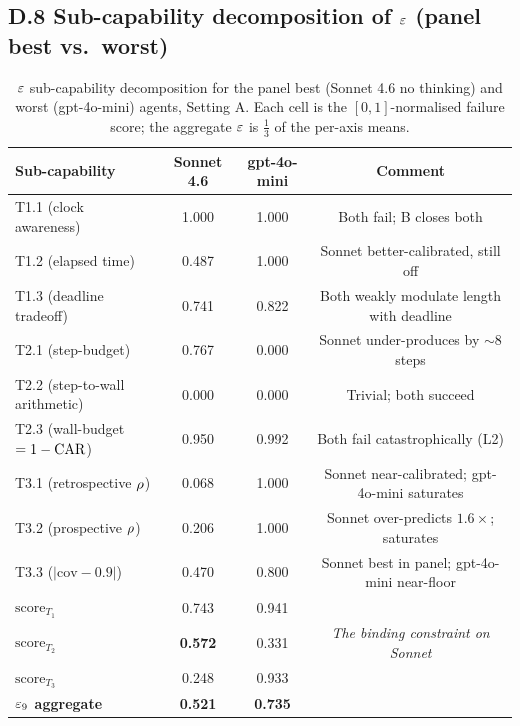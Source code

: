 \subsection*{D.8 Sub-capability decomposition of $\varepsilon$ (panel best vs.\ worst)}

\begin{table}[h]
\centering
\caption{$\varepsilon$ sub-capability decomposition for the panel best (Sonnet 4.6 no thinking) and worst (gpt-4o-mini) agents, Setting A. Each cell is the $[0, 1]$-normalised failure score; the aggregate $\varepsilon$ is $\tfrac{1}{3}$ of the per-axis means.}
\label{tab:epsilon-decomp}
\small
\begin{tabular}{lccc}
\toprule
Sub-capability & Sonnet 4.6 & gpt-4o-mini & Comment \\
\midrule
T1.1 (clock awareness) & 1.000 & 1.000 & Both fail; B closes both \\
T1.2 (elapsed time) & 0.487 & 1.000 & Sonnet better-calibrated, still off \\
T1.3 (deadline tradeoff) & 0.741 & 0.822 & Both weakly modulate length with deadline \\
T2.1 (step-budget) & 0.767 & 0.000 & Sonnet under-produces by $\sim 8$ steps \\
T2.2 (step-to-wall arithmetic) & 0.000 & 0.000 & Trivial; both succeed \\
T2.3 (wall-budget $= 1 - \mathrm{CAR}$) & 0.950 & 0.992 & Both fail catastrophically (L2) \\
T3.1 (retrospective $\rho$) & 0.068 & 1.000 & Sonnet near-calibrated; gpt-4o-mini saturates \\
T3.2 (prospective $\rho$) & 0.206 & 1.000 & Sonnet over-predicts $1.6\times$; saturates \\
T3.3 ($|\text{cov} - 0.9|$) & 0.470 & 0.800 & Sonnet best in panel; gpt-4o-mini near-floor \\
\midrule
$\mathrm{score}_{T_1}$ & 0.743 & 0.941 & \\
$\mathrm{score}_{T_2}$ & \textbf{0.572} & 0.331 & \emph{The binding constraint on Sonnet} \\
$\mathrm{score}_{T_3}$ & 0.248 & 0.933 & \\
\textbf{$\varepsilon_9$ aggregate} & \textbf{0.521} & \textbf{0.735} & \\
\bottomrule
\end{tabular}
\end{table}

